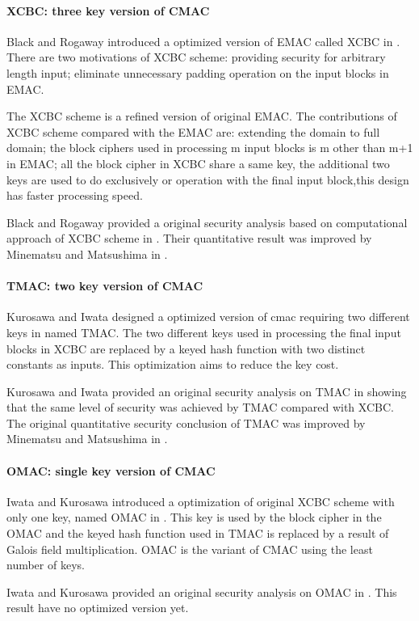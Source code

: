 \documentclass{article}
\begin{document}
\paragraph{XCBC: three key version of CMAC }
Black and Rogaway introduced a optimized version of EMAC called XCBC in \cite{xcbc}.
There are two motivations of XCBC scheme: providing security for arbitrary length input; eliminate unnecessary padding operation on the input blocks in EMAC.

The XCBC scheme is a refined version of original EMAC. The contributions of XCBC scheme compared with the EMAC are: extending the domain to full domain; the block ciphers used in processing m input blocks is m other than m+1 in EMAC; all the block cipher in XCBC share a same key, the additional two keys are used to do exclusively or operation with the final input block,this design has faster processing speed.   

Black and Rogaway provided a original security analysis based on computational approach of XCBC scheme in \cite{xcbc}. Their quantitative result was improved by Minematsu and Matsushima in \cite{new}. 
\paragraph{TMAC: two key version of CMAC}
Kurosawa and Iwata designed a optimized version of cmac requiring two different keys in \cite{tmac} named TMAC.  
The two different keys used in processing the final input blocks in XCBC are replaced by a keyed hash function with two distinct constants as inputs. This optimization aims to reduce the key cost. 

Kurosawa and Iwata provided an original security analysis on TMAC in \cite{tmac} showing that the same level of security was achieved by TMAC compared with XCBC. The original quantitative security conclusion of TMAC was improved by Minematsu and Matsushima in \cite{new}. 
\paragraph{OMAC: single key version of CMAC}
Iwata and Kurosawa introduced a optimization of original XCBC scheme with only one key, named OMAC in \cite{omac}. This key is used by the block cipher in the OMAC and the keyed hash function used in TMAC is replaced by a result of Galois field multiplication. OMAC is the variant of CMAC using the least number of keys. 

Iwata and Kurosawa provided an original security analysis on OMAC in \cite{omac}. This result have no optimized version yet.
\end{document}
